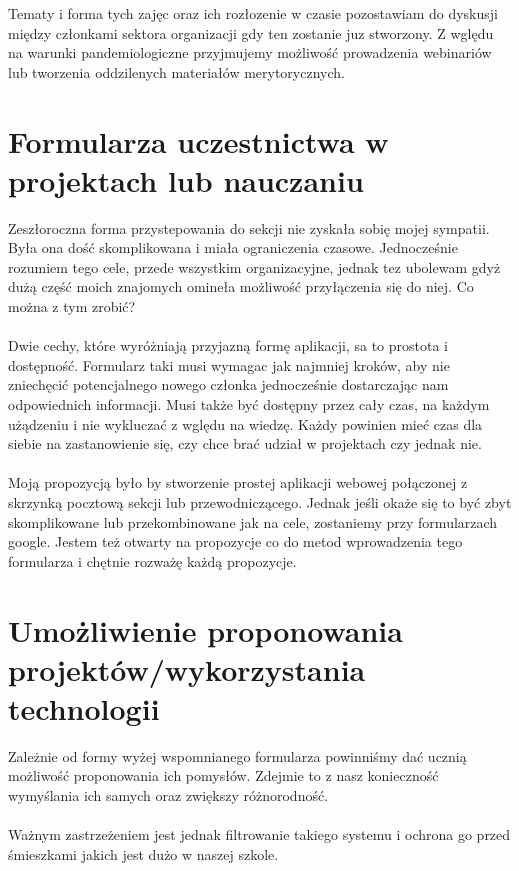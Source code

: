 \documentclass[9pt,a4paper]{report}
\begin{document}
Tematy i forma tych zajęc oraz ich rozłozenie w czasie pozostawiam do dyskusji między członkami sektora organizacji gdy ten zostanie juz stworzony. Z wględu na warunki pandemiologiczne przyjmujemy możliwość prowadzenia webinariów lub tworzenia oddzilenych materiałów merytorycznych.

\section{Formularza uczestnictwa w projektach lub nauczaniu}

Zeszłoroczna forma przystepowania do sekcji nie zyskała sobię mojej sympatii. Była ona dość skomplikowana i miała ograniczenia czasowe. Jednocześnie rozumiem tego cele, przede wszystkim organizacyjne, jednak tez ubolewam gdyż dużą część moich znajomych omineła możliwość przyłączenia się do niej. Co można z tym zrobić?\\\\

Dwie cechy, które wyróżniają przyjazną formę aplikacji, sa to prostota i dostępność. Formularz taki musi wymagac jak najmniej kroków, aby nie zniechęcić potencjalnego nowego członka jednocześnie dostarczając nam odpowiednich informacji. Musi także być dostępny przez cały czas, na każdym użądzeniu i nie wykluczać z wględu na wiedzę. Każdy powinien mieć czas dla siebie na zastanowienie się, czy chce brać udział w projektach czy jednak nie.\\\\

Moją propozycją było by stworzenie prostej aplikacji webowej połączonej z skrzynką pocztową sekcji lub przewodniczącego. Jednak jeśli okaże się to być zbyt skomplikowane lub przekombinowane jak na cele, zostaniemy przy formularzach google. Jestem też otwarty na propozycje co do metod wprowadzenia tego formularza i chętnie rozważę każdą propozycje.

\section{Umożliwienie proponowania projektów/wykorzystania technologii}

Zależnie od formy wyżej wspomnianego formularza powinniśmy dać ucznią możliwość proponowania ich pomysłów. Zdejmie to z nasz konieczność wymyślania ich samych oraz zwiększy różnorodność.\\\\

Ważnym zastrzeżeniem jest jednak filtrowanie takiego systemu i ochrona go przed śmieszkami jakich jest dużo w naszej szkole.
\end{document}
